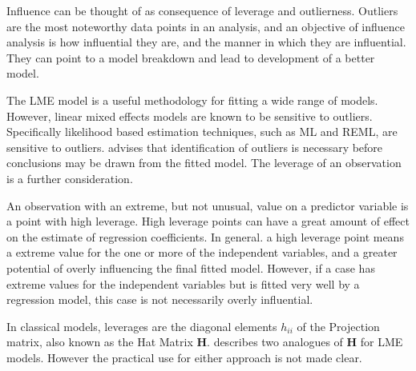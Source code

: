\documentclass[12pt, a4paper]{report}
\theoremstyle{plain}
\theoremstyle{definition}
\theoremstyle{remark}
\begin{document}
	
	
Influence can be thought of as consequence of leverage and outlierness. Outliers are the most noteworthy data points in an analysis, and an objective of influence analysis is how influential they are, and the manner in which they are influential. They can point to a model breakdown and lead to development of a better model.
	
The LME model is a useful methodology for fitting a wide range of models. However, linear mixed effects models are known to be sensitive to outliers. Specifically likelihood based estimation techniques, such as ML and REML, are sensitive to outliers. \citet{Christensen} advises that identification of outliers is necessary before conclusions may be drawn from the fitted model. The leverage of an observation is a further consideration. 
	

An observation with an extreme, but not unusual, value on a predictor variable is a point with high leverage. High leverage points can have a great amount of effect on the estimate of regression coefficients. In general. a high leverage point means a extreme value for the one or more of the independent variables, and a greater potential of overly influencing the final fitted model. However, if a case has  extreme values for the independent variables but is fitted very well by a regression model, this case is not necessarily overly influential.

In classical models, leverages are the diagonal elements $h_{ii}$ of the Projection matrix, also known as the Hat Matrix $\boldsymbol{H}$. \citet{schabenberger} describes two analogues of $\boldsymbol{H}$ for LME models. However the practical use for either approach is not made clear.


	

\end{document}
